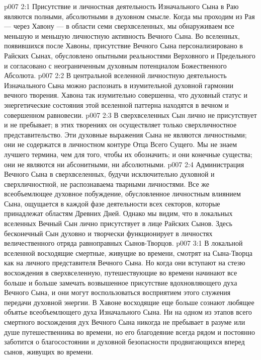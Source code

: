 \vs p007 2:1 Присутствие и личностная деятельность Изначального Сына в Раю являются полными, абсолютными в духовном смысле. Когда мы проходим из Рая --- через Хавону --- в области семи сверхвселенных, мы обнаруживаем все меньшую и меньшую личностную активность Вечного Сына. Во вселенных, появившихся после Хавоны, присутствие Вечного Сына персонализировано в Райских Сынах, обусловлено опытными реальностями Верховного и Предельного и согласовано с неограниченным духовным потенциалом Божественного Абсолюта.
\vs p007 2:2 В центральной вселенной личностную деятельность Изначального Сына можно распознать в изумительной духовной гармонии вечного творения. Хавона так изумительно совершенна, что духовный статус и энергетические состояния этой вселенной паттерна находятся в вечном и совершенном равновесии.
\vs p007 2:3 В сверхвселенных Сын лично не присутствует и не пребывает; в этих творениях он осуществляет только сверхличностное представительство. Эти духовные выражения Сына не являются личностными; они не содержатся в личностном контуре Отца Всего Сущего. Мы не знаем лучшего термина, чем  для того, чтобы их обозначить; и они конечные существа; они не являются ни абсонитными, ни абсолютными.
\vs p007 2:4 Администрация Вечного Сына в сверхвселенных, будучи исключительно духовной и сверхличностной, не распознаваема тварными личностями. Все же всеобъемлющее духовное побуждение, обусловленное личностным влиянием Сына, ощущается в каждой фазе деятельности всех секторов, которые принадлежат областям Древних Дней. Однако мы видим, что в локальных вселенных Вечный Сын лично присутствует в лице Райских Сынов. Здесь бесконечный Сын духовно и творчески функционирует в личностях величественного отряда равноправных Сынов\hyp{}Творцов.
\vs p007 3:1 В локальной вселенной восходящие смертные, живущие во времени, смотрят на Сына\hyp{}Творца как на личного представителя Вечного Сына. Но когда они вступают на стезю восхождения в сверхвселенную, путешествующие во времени начинают все больше и больше замечать возвышенное присутствие вдохновляющего духа Вечного Сына, и они могут воспользоваться восприятием этого служения передачи духовной энергии. В Хавоне восходящие еще больше сознают любящее объятье всеобъемлющего духа Изначального Сына. Ни на одном из этапов всего смертного восхождения дух Вечного Сына никогда не пребывает в разуме или душе путешественника во времени, но его благодеяние всегда рядом и постоянно заботится о благосостоянии и духовной безопасности продвигающихся вперед сынов, живущих во времени.
